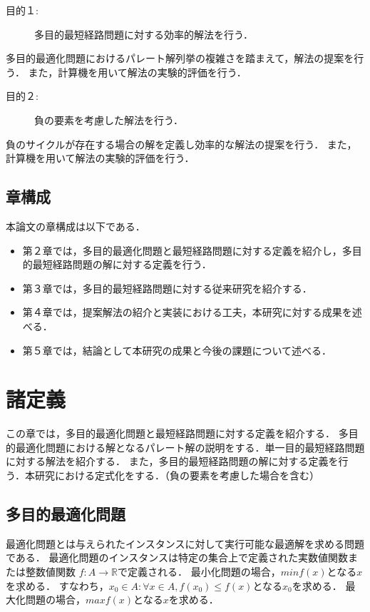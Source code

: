 \documentclass[12pt]{optlab-bachelor}
\begin{document}
\begin{description}
  \item[目的１:]
  多目的最短経路問題に対する効率的解法を行う．
\end{description}

多目的最適化問題におけるパレート解列挙の複雑さを踏まえて，解法の提案を行う．
また，計算機を用いて解法の実験的評価を行う．

\begin{description}
  \item[目的２:]
  負の要素を考慮した解法を行う．
\end{description}

負のサイクルが存在する場合の解を定義し効率的な解法の提案を行う．
また，計算機を用いて解法の実験的評価を行う．

\section{章構成}

  本論文の章構成は以下である．
  \begin{itemize}
  \item 第２章では，多目的最適化問題と最短経路問題に対する定義を紹介し，多目的最短経路問題の解に対する定義を行う．
  \item 第３章では，多目的最短経路問題に対する従来研究を紹介する．
  \item 第４章では，提案解法の紹介と実装における工夫，本研究に対する成果を述べる．
  \item 第５章では，結論として本研究の成果と今後の課題について述べる．
\end{itemize}

\chapter{諸定義}
この章では，多目的最適化問題と最短経路問題に対する定義を紹介する．
多目的最適化問題における解となるパレート解の説明をする．単一目的最短経路問題に対する解法を紹介する．
また，多目的最短経路問題の解に対する定義を行う．本研究における定式化をする．（負の要素を考慮した場合を含む）

\section{多目的最適化問題}
最適化問題とは与えられたインスタンスに対して実行可能な最適解を求める問題である．
最適化問題のインスタンスは特定の集合上で定義された実数値関数または整数値関数
$f : A \rightarrow \mathbb{R}$で定義される．
最小化問題の場合，$minf(x)$となる$x$を求める．
すなわち，$x_0 \in A : \forall x\in A , f(x_0) \leq f(x) $となる$x_0$を求める．
最大化問題の場合，$maxf(x)$となる$x$を求める．
\end{document}
